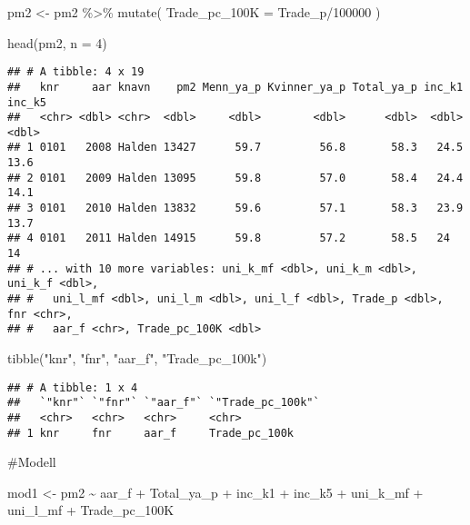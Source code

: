 \documentclass[
]{article}
\newenvironment{Shaded}{\begin{snugshade}}{\end{snugshade}}
\newcommand{\AttributeTok}[1]{\textcolor[rgb]{0.77,0.63,0.00}{#1}}
\newcommand{\DecValTok}[1]{\textcolor[rgb]{0.00,0.00,0.81}{#1}}
\newcommand{\FunctionTok}[1]{\textcolor[rgb]{0.00,0.00,0.00}{#1}}
\newcommand{\NormalTok}[1]{#1}
\newcommand{\OtherTok}[1]{\textcolor[rgb]{0.56,0.35,0.01}{#1}}
\newcommand{\SpecialCharTok}[1]{\textcolor[rgb]{0.00,0.00,0.00}{#1}}
\newcommand{\StringTok}[1]{\textcolor[rgb]{0.31,0.60,0.02}{#1}}
\begin{document}
\begin{Shaded}
\begin{Highlighting}[]
\NormalTok{pm2 }\OtherTok{\textless{}{-}}\NormalTok{ pm2 }\SpecialCharTok{\%\textgreater{}\%} 
  \FunctionTok{mutate}\NormalTok{(}
    \AttributeTok{Trade\_pc\_100K =}\NormalTok{ Trade\_p}\SpecialCharTok{/}\DecValTok{100000}
\NormalTok{  ) }
\end{Highlighting}
\end{Shaded}

\begin{Shaded}
\begin{Highlighting}[]
\FunctionTok{head}\NormalTok{(pm2, }\AttributeTok{n =} \DecValTok{4}\NormalTok{)}
\end{Highlighting}
\end{Shaded}

\begin{verbatim}
## # A tibble: 4 x 19
##   knr     aar knavn    pm2 Menn_ya_p Kvinner_ya_p Total_ya_p inc_k1 inc_k5
##   <chr> <dbl> <chr>  <dbl>     <dbl>        <dbl>      <dbl>  <dbl>  <dbl>
## 1 0101   2008 Halden 13427      59.7         56.8       58.3   24.5   13.6
## 2 0101   2009 Halden 13095      59.8         57.0       58.4   24.4   14.1
## 3 0101   2010 Halden 13832      59.6         57.1       58.3   23.9   13.7
## 4 0101   2011 Halden 14915      59.8         57.2       58.5   24     14  
## # ... with 10 more variables: uni_k_mf <dbl>, uni_k_m <dbl>, uni_k_f <dbl>,
## #   uni_l_mf <dbl>, uni_l_m <dbl>, uni_l_f <dbl>, Trade_p <dbl>, fnr <chr>,
## #   aar_f <chr>, Trade_pc_100K <dbl>
\end{verbatim}

\begin{Shaded}
\begin{Highlighting}[]
\FunctionTok{tibble}\NormalTok{(}\StringTok{"knr"}\NormalTok{, }\StringTok{"fnr"}\NormalTok{, }\StringTok{"aar\_f"}\NormalTok{, }\StringTok{"Trade\_pc\_100k"}\NormalTok{)}
\end{Highlighting}
\end{Shaded}

\begin{verbatim}
## # A tibble: 1 x 4
##   `"knr"` `"fnr"` `"aar_f"` `"Trade_pc_100k"`
##   <chr>   <chr>   <chr>     <chr>            
## 1 knr     fnr     aar_f     Trade_pc_100k
\end{verbatim}

\#Modell

\begin{Shaded}
\begin{Highlighting}[]
\NormalTok{mod1 }\OtherTok{\textless{}{-}} \StringTok{\textquotesingle{}pm2 \textasciitilde{} aar\_f + Total\_ya\_p + inc\_k1 + inc\_k5 + uni\_k\_mf + uni\_l\_mf + Trade\_pc\_100K\textquotesingle{}}
\end{Highlighting}
\end{Shaded}
\end{document}
